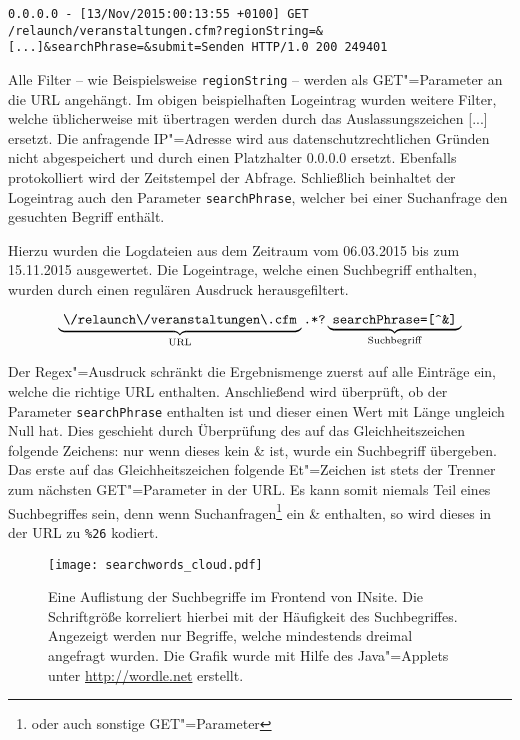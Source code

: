 \begin{listing}
\begin{verbatim}
0.0.0.0 - [13/Nov/2015:00:13:55 +0100] GET /relaunch/veranstaltungen.cfm?regionString=&[...]&searchPhrase=&submit=Senden HTTP/1.0 200 249401
\end{verbatim}
\end{listing}

Alle Filter -- wie Beispielsweise \texttt{regionString} -- werden als GET"=Parameter an die URL angehängt. Im obigen beispielhaften Logeintrag wurden weitere Filter, welche üblicherweise mit übertragen werden durch das Auslassungszeichen [...] ersetzt. Die anfragende IP"=Adresse wird aus datenschutzrechtlichen Gründen nicht abgespeichert und durch einen Platzhalter 0.0.0.0 ersetzt. Ebenfalls protokolliert wird der Zeitstempel der Abfrage. Schließlich beinhaltet der Logeintrag auch den Parameter \texttt{searchPhrase}, welcher bei einer Suchanfrage den gesuchten Begriff enthält.

Hierzu wurden die Logdateien aus dem Zeitraum vom 06.03.2015 bis zum 15.11.2015 ausgewertet. Die Logeintrage, welche einen Suchbegriff enthalten, wurden durch einen regulären Ausdruck herausgefiltert.

\begin{equation*}
\underbrace{
	\text{
		\texttt{\textbackslash/relaunch\textbackslash/veranstaltungen\textbackslash.cfm}
	}
}_{\text{URL}}
\text{\texttt{.*?}}
\underbrace{
	\text{
		\texttt{searchPhrase=[\textasciicircum\&]}
	}
}_{\text{Suchbegriff}}
\end{equation*}

Der Regex"=Ausdruck schränkt die Ergebnismenge zuerst auf alle Einträge ein, welche die richtige URL enthalten. Anschließend wird überprüft, ob der Parameter \texttt{searchPhrase} enthalten ist und dieser einen Wert mit Länge ungleich Null hat. Dies geschieht durch Überprüfung des auf das Gleichheitszeichen folgende Zeichens: nur wenn dieses kein \& ist, wurde ein Suchbegriff übergeben. Das erste auf das Gleichheitszeichen folgende Et"=Zeichen ist stets der Trenner zum nächsten GET"=Parameter in der URL. Es kann somit niemals Teil eines Suchbegriffes sein, denn wenn Suchanfragen\footnote{oder auch sonstige GET"=Parameter} ein \& enthalten, so wird dieses in der URL zu \texttt{\%26} kodiert.


\begin{figure}[ht!]
\begin{margincap}
\centering
\texttt{[image: searchwords\_cloud.pdf]}
\caption[Häufige Suchbegriffe]{Eine Auflistung der Suchbegriffe im Frontend von INsite. Die Schriftgröße korreliert hierbei mit der Häufigkeit des Suchbegriffes. Angezeigt werden nur Begriffe, welche mindestends dreimal angefragt wurden. Die Grafik wurde mit Hilfe des Java"=Applets unter \url{http://wordle.net} erstellt.}
\label{img:searchword_cloud}
\end{margincap}
\end{figure}



